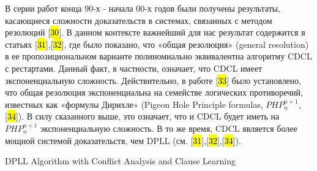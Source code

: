В серии работ конца 90-х \-- начала 00-х годов были получены результаты, касающиеся сложности доказательств в системах, связанных с методом резолюций {[}\hl{30}{]}. В данном контексте важнейший для нас результат содержится в статьях {[}\hl{31}{]},{[}\hl{32}{]}, где было показано, что «общая резолюция» (general resolution) в ее пропозициональном варианте полиномиально эквивалентна алгоритму CDCL с рестартами. Данный факт, в частности, означает, что CDCL имеет экспоненциальную сложность. Действительно, в работе {[}\hl{33}{]} было установлено, что общая резолюция экспоненциальна на семействе логических противоречий, известных как «формулы Дирихле» (Pigeon Hole Principle formulas, $PHP_{n}^{n + 1}$, {[}\hl{34}{]}). В силу сказанного выше, это означает, что и CDCL будет иметь на $PHP_{n}^{n + 1}$ экспоненциальную сложность. В то же время, CDCL является более мощной системой доказательств, чем DPLL (см. {[}\hl{31}{]},{[}\hl{32}{]},{[}\hl{34}{]}).




\begin{algorithm}[H]
    \caption{DPLL Algorithm with Conflict Analysis and Clause Learning}
    \DontPrintSemicolon


\end{algorithm}


